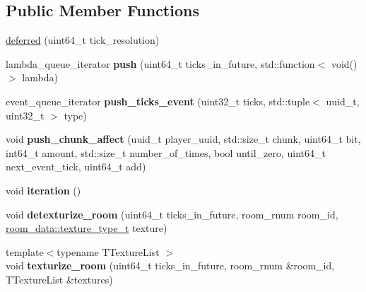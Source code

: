 \subsection*{Public Member Functions}
\begin{DoxyCompactItemize}
\item 
\hyperlink{classmods_1_1deferred_a4ddaf679f5be96555258be883fa111e7}{deferred} (uint64\+\_\+t tick\+\_\+resolution)
\item 
\mbox{\label{classmods_1_1deferred_a9f6d88929a03abf7ffa0b73c58133880}} 
lambda\+\_\+queue\+\_\+iterator {\bfseries push} (uint64\+\_\+t ticks\+\_\+in\+\_\+future, std\+::function$<$ void()$>$ lambda)
\item 
\mbox{\label{classmods_1_1deferred_a7b16b29be46808030a1355a367de436a}} 
event\+\_\+queue\+\_\+iterator {\bfseries push\+\_\+ticks\+\_\+event} (uint32\+\_\+t ticks, std\+::tuple$<$ uuid\+\_\+t, uint32\+\_\+t $>$ type)
\item 
\mbox{\label{classmods_1_1deferred_ae54a47e45569c967ee908028f1d98665}} 
void {\bfseries push\+\_\+chunk\+\_\+affect} (uuid\+\_\+t player\+\_\+uuid, std\+::size\+\_\+t chunk, uint64\+\_\+t bit, int64\+\_\+t amount, std\+::size\+\_\+t number\+\_\+of\+\_\+times, bool until\+\_\+zero, uint64\+\_\+t next\+\_\+event\+\_\+tick, uint64\+\_\+t add)
\item 
\mbox{\label{classmods_1_1deferred_a338b00519d462a4e4d7756d375311075}} 
void {\bfseries iteration} ()
\item 
\mbox{\label{classmods_1_1deferred_abf5badd8da9a2f207dcda53c693a3437}} 
void {\bfseries detexturize\+\_\+room} (uint64\+\_\+t ticks\+\_\+in\+\_\+future, room\+\_\+rnum room\+\_\+id, \hyperlink{structroom__data_a9552b46091ee649079e41f04f9543b8e}{room\+\_\+data\+::texture\+\_\+type\+\_\+t} texture)
\item 
\mbox{\label{classmods_1_1deferred_a794e4677afb086836ecd3207d2d28fc4}} 
{\footnotesize template$<$typename T\+Texture\+List $>$ }\\void {\bfseries texturize\+\_\+room} (uint64\+\_\+t ticks\+\_\+in\+\_\+future, room\+\_\+rnum \&room\+\_\+id, T\+Texture\+List \&textures)
\item 

\end{DoxyCompactItemize}
